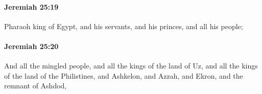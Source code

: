 		\paragraph{Jeremiah 25:19} %
			\label{JEREMIAH-25-19}

			Pharaoh king of Egypt, and his servants, and his princes, and all his people;


		\paragraph{Jeremiah 25:20} %
			\label{JEREMIAH-25-20}

			And all the mingled people, and all the kings of the land of Uz, and all the kings of the land of the Philistines, and Ashkelon, and Azzah, and Ekron, and the remnant of Ashdod,


